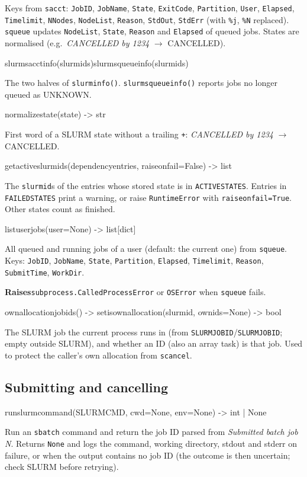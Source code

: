 \documentclass[11pt,a4paper]{article}
\newcommand{\api}[1]{%
  \par\medskip
  \begin{tcolorbox}[colback=sigbg, colframe=sigbg, boxrule=0pt, arc=1pt, left=4pt, right=4pt, top=2pt, bottom=2pt, breakable]
  \raggedright\ttfamily\small #1
  \end{tcolorbox}\nopagebreak\vspace{-4pt}%
}
\DeclareRobustCommand{\_}{\textunderscore\allowbreak}
\newcommand{\cmd}[1]{\texttt{#1}}
\newcommand{\raises}{\par\textsf{\small\bfseries Raises}\quad}
\begin{document}
Keys from \cmd{sacct}: \cmd{JobID}, \cmd{JobName}, \cmd{State}, \cmd{ExitCode}, \cmd{Partition},
\cmd{User}, \cmd{Elapsed}, \cmd{Timelimit}, \cmd{NNodes}, \cmd{NodeList}, \cmd{Reason}, \cmd{StdOut},
\cmd{StdErr} (with \cmd{\%j}, \cmd{\%N} replaced). \cmd{squeue} updates \cmd{NodeList}, \cmd{State},
\cmd{Reason} and \cmd{Elapsed} of queued jobs. States are normalised
(e.g.\ \emph{CANCELLED by 1234} $\rightarrow$ CANCELLED).

\api{slurm\_sacct\_info(slurm\_ids)\quad slurm\_squeue\_info(slurm\_ids)}
The two halves of \cmd{slurm\_info()}. \cmd{slurm\_squeue\_info()} reports jobs no longer queued as
UNKNOWN.

\api{normalize\_state(state) -> str}
First word of a SLURM state without a trailing \cmd{+}: \emph{CANCELLED by 1234} $\rightarrow$ CANCELLED.

\api{get\_active\_slurmids(dependency\_entries, raise\_on\_fail=False) -> list}
The \cmd{slurm\_id}s of the entries whose stored state is in \cmd{ACTIVE\_STATES}. Entries in
\cmd{FAILED\_STATES} print a warning, or raise \cmd{RuntimeError} with
\cmd{raise\_on\_fail=True}. Other states count as finished.

\api{list\_user\_jobs(user=None) -> list[dict]}
All queued and running jobs of a user (default: the current one) from \cmd{squeue}. Keys:
\cmd{JobID}, \cmd{JobName}, \cmd{State}, \cmd{Partition}, \cmd{Elapsed}, \cmd{Timelimit},
\cmd{Reason}, \cmd{SubmitTime}, \cmd{WorkDir}.
\raises \cmd{subprocess.CalledProcessError} or \cmd{OSError} when \cmd{squeue} fails.

\api{own\_allocation\_job\_ids() -> set\quad is\_own\_allocation(slurm\_id, own\_ids=None) -> bool}
The SLURM job the current process runs in (from \cmd{SLURM\_JOB\_ID}/\cmd{SLURM\_JOBID}; empty
outside SLURM), and whether an ID (also an array task) is that job. Used to protect the caller's
own allocation from \cmd{scancel}.

\subsection{Submitting and cancelling}

\api{run\_slurm\_command(SLURM\_CMD, cwd=None, env=None) -> int | None}
Run an \cmd{sbatch} command and return the job ID parsed from \emph{Submitted batch job N}.
Returns \cmd{None} and logs the command, working directory, stdout and stderr on failure, or when
the output contains no job ID (the outcome is then uncertain; check SLURM before retrying).
\end{document}
